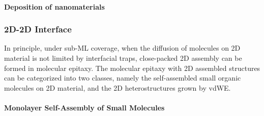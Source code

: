 \paragraph{Deposition of nanomaterials}




\subsubsection{2D-2D Interface}
\label{sec:org1d44ccd}

In principle, under sub-ML coverage, when the diffusion of molecules on  2D
material is not limited by interfacial traps, close-packed 2D assembly
can be formed in molecular epitaxy. The molecular epitaxy with
2D assembled structures can be categorized into two classes, namely the
self-assembled small organic molecules on 2D material, and the
2D heterostructures grown by vdWE.

\paragraph{Monolayer Self-Assembly of Small Molecules}
\label{sec:orgfd77377}

